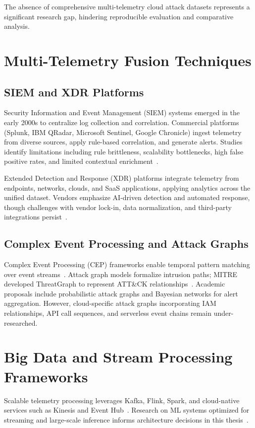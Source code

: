 The absence of comprehensive multi-telemetry cloud attack datasets represents a significant research gap, hindering reproducible evaluation and comparative analysis.

\section{Multi-Telemetry Fusion Techniques}\label{sec:lit-fusion}
\subsection{SIEM and XDR Platforms}
Security Information and Event Management (SIEM) systems emerged in the early 2000s to centralize log collection and correlation. Commercial platforms (Splunk, IBM QRadar, Microsoft Sentinel, Google Chronicle) ingest telemetry from diverse sources, apply rule-based correlation, and generate alerts. Studies identify limitations including rule brittleness, scalability bottlenecks, high false positive rates, and limited contextual enrichment~\cite{axelsson2000fprates,elshoush2011siemsurvey}.

Extended Detection and Response (XDR) platforms integrate telemetry from endpoints, networks, clouds, and SaaS applications, applying analytics across the unified dataset. Vendors emphasize AI-driven detection and automated response, though challenges with vendor lock-in, data normalization, and third-party integrations persist~\cite{gartner2023xdr}.

\subsection{Complex Event Processing and Attack Graphs}
Complex Event Processing (CEP) frameworks enable temporal pattern matching over event streams~\cite{luckham2012cep,albanese2017cep}. Attack graph models formalize intrusion paths; MITRE developed ThreatGraph to represent ATT\&CK relationships~\cite{mitrethreatgraph2023}. Academic proposals include probabilistic attack graphs and Bayesian networks for alert aggregation. However, cloud-specific attack graphs incorporating IAM relationships, API call sequences, and serverless event chains remain under-researched.

\section{Big Data and Stream Processing Frameworks}
Scalable telemetry processing leverages Kafka, Flink, Spark, and cloud-native services such as Kinesis and Event Hub~\cite{zaharia2016apache,balaji2021flink}. Research on ML systems optimized for streaming and large-scale inference informs architecture decisions in this thesis~\cite{palkar2018weld}.

